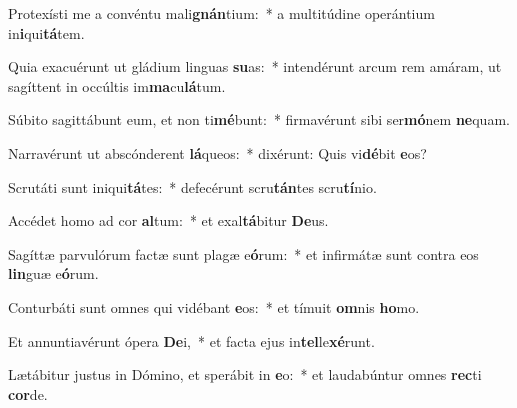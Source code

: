\item Protexísti me a convéntu mali\textbf{gnán}tium:~* a multitúdine operántium in\textbf{i}qui\textbf{tá}tem.
\item Quia exacuérunt ut gládium linguas \textbf{su}as:~* intendérunt arcum rem amáram, ut sagíttent in occúltis im\textbf{ma}cu\textbf{lá}tum.
\item Súbito sagittábunt eum, et non ti\textbf{mé}bunt:~* firmavérunt sibi ser\textbf{mó}nem \textbf{ne}quam.
\item Narravérunt ut abscónderent \textbf{lá}queos:~* dixérunt: Quis vi\textbf{dé}bit \textbf{e}os?
\item Scrutáti sunt iniqui\textbf{tá}tes:~* defecérunt scru\textbf{tán}tes scru\textbf{tí}nio.
\item Accédet homo ad cor \textbf{al}tum:~* et exal\textbf{tá}bitur \textbf{De}us.
\item Sagíttæ parvulórum factæ sunt plagæ e\textbf{ó}rum:~* et infirmátæ sunt contra eos \textbf{lin}guæ e\textbf{ó}rum.
\item Conturbáti sunt omnes qui vidébant \textbf{e}os:~* et tímuit \textbf{om}nis \textbf{ho}mo.
\item Et annuntiavérunt ópera \textbf{De}i,~* et facta ejus in\textbf{tel}le\textbf{xé}runt.
\item Lætábitur justus in Dómino, et sperábit in \textbf{e}o:~* et laudabúntur omnes \textbf{rec}ti \textbf{cor}de.
